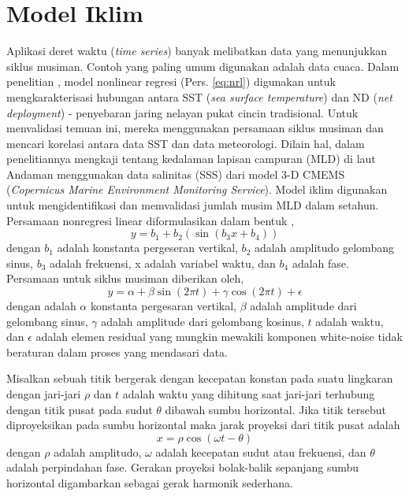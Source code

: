 \section[Model Iklim]{Model Iklim}
\begin{spacing}{1.5}
	Aplikasi deret waktu (\textit{time series}) banyak melibatkan data yang menunjukkan siklus musiman. Contoh yang paling umum digunakan adalah data cuaca. Dalam penelitian , model nonlinear regresi (Pers. \ref{eq:nrl}) digunakan untuk mengkarakterisasi hubungan antara SST (\textit{sea surface temperature}) dan ND (\textit{net deployment}) - penyebaran jaring nelayan pukat cincin tradisional. Untuk menvalidasi temuan ini, mereka menggunakan persamaan siklus musiman  dan mencari korelasi antara data SST dan data meteorologi. Dilain hal,  dalam penelitiannya mengkaji tentang kedalaman lapisan campuran (MLD) di laut Andaman menggunakan data salinitas (SSS) dari model 3-D CMEMS (\textit{Copernicus Marine Environment Monitoring Service}). Model iklim digunakan untuk mengidentifikasi dan memvalidasi jumlah musim MLD dalam setahun. Persamaan nonregresi linear  diformulasikan dalam bentuk ,
	\begin{equation}\label{eq:nrl}
		y = b_1 + b_2(\sin(b_3x+b_4))
	\end{equation}
	dengan $b_1$ adalah konstanta pergeseran vertikal, $b_2$ adalah amplitudo gelombang sinus, $b_3$ adalah frekuensi, x adalah variabel waktu, dan $b_4$ adalah fase.
	Persamaan untuk siklus musiman  diberikan oleh,
	\begin{equation}
		y = \alpha + \beta \sin(2\pi t)+\gamma \cos(2\pi t) + \epsilon
	\end{equation}
	dengan adalah $\alpha$ konstanta pergesaran vertikal, $\beta$ adalah amplitude dari gelombang sinus, $\gamma$ adalah amplitude dari gelombang kosinus, $t$ adalah waktu, dan $\epsilon$ adalah elemen residual yang mungkin mewakili komponen white-noise tidak beraturan dalam proses yang mendasari data.
	
	Misalkan sebuah titik bergerak dengan kecepatan konstan pada suatu lingkaran dengan jari-jari $\rho$ dan $t$ adalah waktu yang dihitung saat jari-jari terhubung dengan titik pusat pada sudut $\theta$ dibawah sumbu horizontal. Jika titik tersebut diproyeksikan pada sumbu horizontal maka jarak proyeksi dari titik pusat adalah 
	\begin{equation}\label{eq:MIK1}
		x = \rho \cos(\omega t-\theta)
	\end{equation}
	dengan $\rho$ adalah amplitudo, $\omega$ adalah kecepatan sudut atau frekuensi, dan $\theta$ adalah perpindahan fase. Gerakan proyeksi bolak-balik sepanjang sumbu horizontal digambarkan sebagai gerak harmonik sederhana.
	

\end{spacing}
